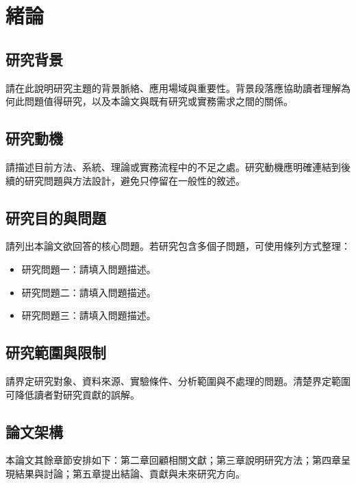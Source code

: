 \chapter{緒論}

\section{研究背景}

請在此說明研究主題的背景脈絡、應用場域與重要性。背景段落應協助讀者理解為何此問題值得研究，以及本論文與既有研究或實務需求之間的關係。

\section{研究動機}

請描述目前方法、系統、理論或實務流程中的不足之處。研究動機應明確連結到後續的研究問題與方法設計，避免只停留在一般性的敘述。

\section{研究目的與問題}

請列出本論文欲回答的核心問題。若研究包含多個子問題，可使用條列方式整理：

\begin{itemize}
  \item 研究問題一：請填入問題描述。
  \item 研究問題二：請填入問題描述。
  \item 研究問題三：請填入問題描述。
\end{itemize}

\section{研究範圍與限制}

請界定研究對象、資料來源、實驗條件、分析範圍與不處理的問題。清楚界定範圍可降低讀者對研究貢獻的誤解。

\section{論文架構}

本論文其餘章節安排如下：第二章回顧相關文獻；第三章說明研究方法；第四章呈現結果與討論；第五章提出結論、貢獻與未來研究方向。
